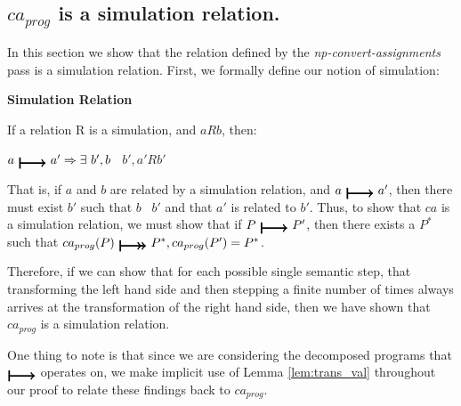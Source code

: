




\subsection{$ca_{prog}$ is a simulation relation.\label{sxn:sim}}
In this section we show that the relation defined by the \textit{np-convert-assignments} pass is a simulation relation. First, we formally define our notion of simulation:

\begin{definition} \textbf{Simulation Relation}

If a relation R is a simulation, and $aRb$, then:

$a\ \step\ a' => \exists\ b', b$ \trstep\ $b', a'Rb'$
\end{definition}

That is, if $a$ and $b$ are related by a simulation relation, and $a\ \step\ a'$, then there must exist $b'$ such that $b$ \trstep\ $b'$ and that $a'$ is related to $b'$. Thus, to show that $ca$ is a simulation relation, we must show that if $P\ \step\ P'$, then there exists a ${P^{*}}$ such that $ca_{prog}(P)\ \trstep\ {P^{*}}, ca_{prog}(P') = {P^{*}}$.

Therefore, if we can show that for each possible single semantic step, that transforming the left hand side and then stepping a finite number of times always arrives at the transformation of the right hand side, then we have shown that $ca_{prog}$ is a simulation relation.

One thing to note is that since we are considering the decomposed programs that $\step$ operates on, we make implicit use of Lemma \ref{lem:trans_val} throughout our proof to relate these findings back to $ca_{prog}$.


